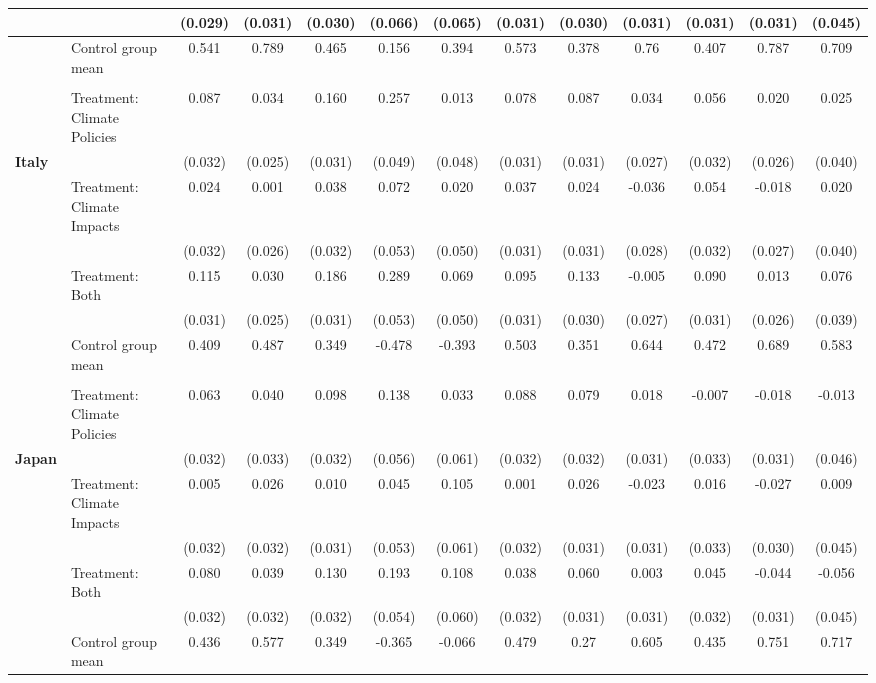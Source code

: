 \begin{tabular}[t]{llccccccccccc}
 &  & (0.029) & (0.031) & (0.030) & (0.066) & (0.065) & (0.031) & (0.030) & (0.031) & (0.031) & (0.031) & (0.045)\\
\midrule
 & Control group mean & 0.541 & 0.789 & 0.465 & 0.156 & 0.394 & 0.573 & 0.378 & 0.76 & 0.407 & 0.787 & 0.709\\
 &  &  &  &  &  &  &  &  &  &  &  & \\
 & Treatment: Climate Policies & 0.087 & 0.034 & 0.160 & 0.257 & 0.013 & 0.078 & 0.087 & 0.034 & 0.056 & 0.020 & 0.025\\
\textbf{Italy} &  & (0.032) & (0.025) & (0.031) & (0.049) & (0.048) & (0.031) & (0.031) & (0.027) & (0.032) & (0.026) & (0.040)\\
 & Treatment: Climate Impacts & 0.024 & 0.001 & 0.038 & 0.072 & 0.020 & 0.037 & 0.024 & -0.036 & 0.054 & -0.018 & 0.020\\
 &  & (0.032) & (0.026) & (0.032) & (0.053) & (0.050) & (0.031) & (0.031) & (0.028) & (0.032) & (0.027) & (0.040)\\
 & Treatment: Both & 0.115 & 0.030 & 0.186 & 0.289 & 0.069 & 0.095 & 0.133 & -0.005 & 0.090 & 0.013 & 0.076\\
 &  & (0.031) & (0.025) & (0.031) & (0.053) & (0.050) & (0.031) & (0.030) & (0.027) & (0.031) & (0.026) & (0.039)\\
\midrule
 & Control group mean & 0.409 & 0.487 & 0.349 & -0.478 & -0.393 & 0.503 & 0.351 & 0.644 & 0.472 & 0.689 & 0.583\\
 &  &  &  &  &  &  &  &  &  &  &  & \\
 & Treatment: Climate Policies & 0.063 & 0.040 & 0.098 & 0.138 & 0.033 & 0.088 & 0.079 & 0.018 & -0.007 & -0.018 & -0.013\\
\textbf{Japan} &  & (0.032) & (0.033) & (0.032) & (0.056) & (0.061) & (0.032) & (0.032) & (0.031) & (0.033) & (0.031) & (0.046)\\
 & Treatment: Climate Impacts & 0.005 & 0.026 & 0.010 & 0.045 & 0.105 & 0.001 & 0.026 & -0.023 & 0.016 & -0.027 & 0.009\\
 &  & (0.032) & (0.032) & (0.031) & (0.053) & (0.061) & (0.032) & (0.031) & (0.031) & (0.033) & (0.030) & (0.045)\\
 & Treatment: Both & 0.080 & 0.039 & 0.130 & 0.193 & 0.108 & 0.038 & 0.060 & 0.003 & 0.045 & -0.044 & -0.056\\
 &  & (0.032) & (0.032) & (0.032) & (0.054) & (0.060) & (0.032) & (0.031) & (0.031) & (0.032) & (0.031) & (0.045)\\
\midrule
 & Control group mean & 0.436 & 0.577 & 0.349 & -0.365 & -0.066 & 0.479 & 0.27 & 0.605 & 0.435 & 0.751 & 0.717\\

\end{tabular}

